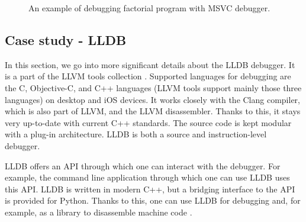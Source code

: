 \begin{figure}
    \caption{An example of debugging factorial program with MSVC debugger.}
    \label{fig:msvc}
\end{figure}

\subsection{Case study - LLDB}\label{section:case-study}
In this section, we go into more significant details about the LLDB \cite{lldb}
debugger. It is a part of the LLVM tools collection \cite{llvm}. Supported
languages for debugging are the C, Objective-C, and C++ languages (LLVM tools
support mainly those three languages) on desktop and iOS devices. It works
closely with the Clang compiler, which is also part of LLVM, and the LLVM
disassembler. Thanks to this, it stays very up-to-date with current C++
standards. The source code is kept modular with a plug-in architecture. LLDB is
both a source and instruction-level debugger.

LLDB offers an API through which one can interact with the debugger. For
example, the command line application through which one can use LLDB uses this
API. LLDB is written in modern C++, but a bridging interface to the API is
provided for Python. Thanks to this, one can use LLDB for debugging and, for
example, as a library to disassemble machine code \cite{lldb}.

